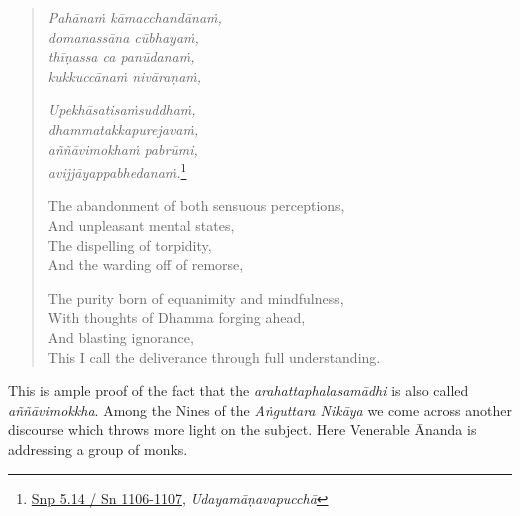 \begin{quote}
\emph{Pahānaṁ kāmacchandānaṁ,}\\
\emph{domanassāna cūbhayaṁ,}\\
\emph{thīṇassa ca panūdanaṁ,}\\
\emph{kukkuccānaṁ nivāraṇaṁ,}

\emph{Upekhāsatisaṁsuddhaṁ,}\\
\emph{dhammatakkapurejavaṁ,}\\
\emph{aññāvimokhaṁ pabrūmi,}\\
\emph{avijjāyappabhedanaṁ.}\footnote{\href{https://suttacentral.net/snp5.14/pli/ms}{Snp 5.14 / Sn 1106-1107}, \emph{Udayamāṇavapucchā}}

The abandonment of both sensuous perceptions,\\
And unpleasant mental states,\\
The dispelling of torpidity,\\
And the warding off of remorse,

The purity born of equanimity and mindfulness,\\
With thoughts of Dhamma forging ahead,\\
And blasting ignorance,\\
This I call the deliverance through full understanding.
\end{quote}

This is ample proof of the fact that the \emph{arahattaphalasamādhi} is also called \emph{aññāvimokkha}. Among the Nines of the \emph{Aṅguttara Nikāya} we come across another discourse which throws more light on the subject. Here Venerable Ānanda is addressing a group of monks.

